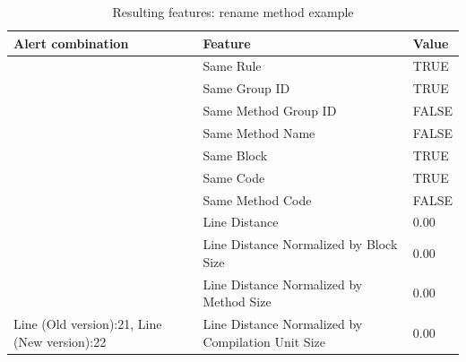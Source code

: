 \documentclass[
]{article}
\begin{document}
\begin{table}[!h]

\caption{\label{tab:unnamed-chunk-7}Resulting features: rename method example \label{features_rename} }
\centering
\begin{tabular}[t]{l|l|l}
\hline
Alert combination & Feature & Value\\
\hline
\rowcolor{gray!6}   & Same Rule & TRUE\\

 & Same Group ID & TRUE\\

\rowcolor{gray!6}   & Same Method Group ID & FALSE\\

 & Same Method Name & FALSE\\

\rowcolor{gray!6}   & Same Block & TRUE\\

 & Same Code & TRUE\\

\rowcolor{gray!6}   & Same Method Code & FALSE\\

 & Line Distance & 0.00\\

\rowcolor{gray!6}   & Line Distance Normalized by Block Size & 0.00\\

 & Line Distance Normalized by Method Size & 0.00\\

\multirow[t]{-11}{*}{\raggedright\arraybackslash Line (Old version):21, Line (New version):22} & Line Distance Normalized by Compilation Unit Size & 0.00\\
\hline
\end{tabular}
\end{table}

\normalsize

\newpage
\end{document}
